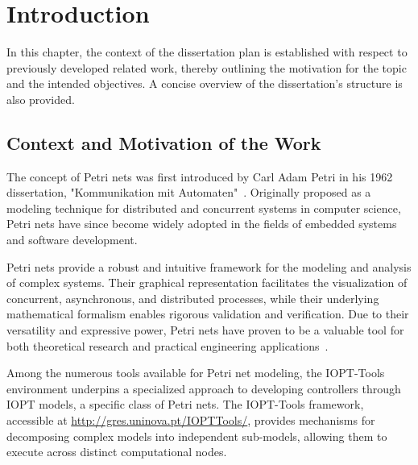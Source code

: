 
%

\chapter{Introduction}
\label{cha:introduction}


\epigraphfontsize{\small\itshape}
\setlength\epigraphwidth{12.5cm}
\setlength\epigraphrule{0pt}

In this chapter, the context of the dissertation plan is established with respect to previously developed related work, thereby outlining the motivation for the topic and the intended objectives. A concise overview of the dissertation’s structure is also provided.

\section{Context and Motivation of the Work}
\label{sec:context_and_motivation_of_the_work}


The concept of Petri nets was first introduced by Carl Adam Petri in his 1962 dissertation, "Kommunikation mit Automaten"~\cite{petri1962}. Originally proposed as a modeling technique for distributed and concurrent systems in computer science, Petri nets have since become widely adopted in the fields of embedded systems and software development.

Petri nets provide a robust and intuitive framework for the modeling and analysis of complex systems. Their graphical representation facilitates the visualization of concurrent, asynchronous, and distributed processes, while their underlying mathematical formalism enables rigorous validation and verification. Due to their versatility and expressive power, Petri nets have proven to be a valuable tool for both theoretical research and practical engineering applications~\cite{murata}.

Among the numerous tools available for Petri net modeling, the IOPT-Tools environment underpins a specialized approach to developing controllers through IOPT models, a specific class of Petri nets. The IOPT-Tools framework, accessible at \url{http://gres.uninova.pt/IOPTTools/}, provides mechanisms for decomposing complex models into independent sub-models, allowing them to execute across distinct computational nodes.

